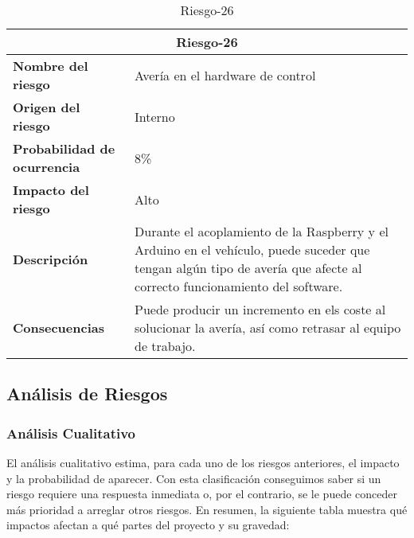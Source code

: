 \begin{table}[H]
\begin{center}
\begin{tabular}{p{} p{7cm}}
\multicolumn{2}{c}{\textbf{Riesgo-26} } \\
\hline \hline
\textbf{Nombre del riesgo} & Avería en el hardware de control \\
\hline
\textbf{Origen del riesgo} & Interno \\
\hline
\textbf{Probabilidad de ocurrencia} & 8\%  \\
\hline
\textbf{Impacto del riesgo} &  Alto \\
\hline
\textbf{Descripción} &  Durante el acoplamiento de la Raspberry y el Arduino en el vehículo, puede suceder que tengan  algún tipo de avería que afecte al correcto funcionamiento del software. \\
\hline
\textbf{Consecuencias} &  Puede producir un incremento en els coste al solucionar la avería, así como retrasar al equipo de trabajo.  \\
\hline
\end{tabular}
\caption{Riesgo-26}
\label{tab:Riesgo-26}
\end{center}
\end{table}

\subsection{Análisis de Riesgos}
\subsubsection{Análisis Cualitativo}
\par El análisis cualitativo estima, para cada uno de los riesgos anteriores, el impacto y la probabilidad de aparecer. Con esta clasificación conseguimos saber si un riesgo requiere una respuesta inmediata o, por el contrario, se le puede conceder más prioridad a arreglar otros riesgos. En resumen, la siguiente tabla muestra qué impactos afectan a qué partes del proyecto y su gravedad:

